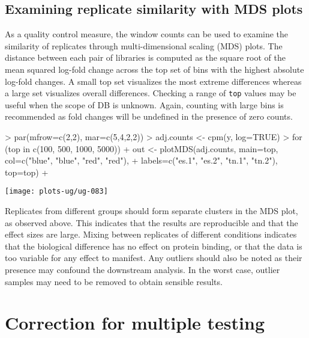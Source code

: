 \documentclass[12pt]{report}
\renewenvironment{Schunk}{\vspace{0pt}}{\vspace{0pt}}
\newcommand{\code}[1]{{\small\texttt{#1}}}
\begin{document}
\section{Examining replicate similarity with MDS plots}
As a quality control measure, the window counts can be used to examine the similarity of replicates through multi-dimensional scaling (MDS) plots. 
The distance between each pair of libraries is computed as the square root of the mean squared log-fold change across the top set of bins with the highest absolute log-fold changes.
A small top set visualizes the most extreme differences whereas a large set visualizes overall differences.
Checking a range of \code{top} values may be useful when the scope of DB is unknown.
Again, counting with large bins is recommended as fold changes will be undefined in the presence of zero counts.

\begin{Schunk}
\begin{Sinput}
> par(mfrow=c(2,2), mar=c(5,4,2,2))
> adj.counts <- cpm(y, log=TRUE)
> for (top in c(100, 500, 1000, 5000)) {
+     out <- plotMDS(adj.counts, main=top, col=c("blue", "blue", "red", "red"),
+         labels=c("es.1", "es.2", "tn.1", "tn.2"), top=top)
+ }
\end{Sinput}
\end{Schunk}

\begin{center}
\texttt{[image: plots-ug/ug-083]}
\end{center}

Replicates from different groups should form separate clusters in the MDS plot, as observed above.
This indicates that the results are reproducible and that the effect sizes are large.
Mixing between replicates of different conditions indicates that the biological difference has no effect on protein binding, or that the data is too variable for any effect to manifest.
Any outliers should also be noted as their presence may confound the downstream analysis.
In the worst case, outlier samples may need to be removed to obtain sensible results.



\chapter{Correction for multiple testing}
\end{document}
